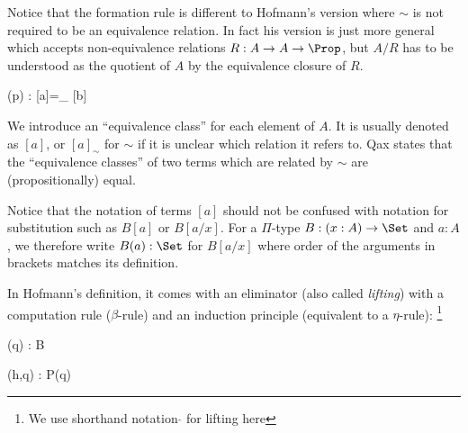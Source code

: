 \begin{remark}
Notice that the formation rule is different to Hofmann's version \cite{hof:95:sm} where $\sim$ is not required to be an equivalence relation. In fact his version is just more general which accepts non-equivalence relations $R : A \to A \to \Prop$, but $A/R$ has to be understood as the quotient of $A$ by the equivalence closure of $R$.
\end{remark}

\begin{multicols}{2}
\columnbreak
{}
{ \Gamma \vdash {}(p) : [a]=_{} [b]}
\end{multicols}


We introduce an ``equivalence class'' for each element of $A$. It is usually denoted as $[ a ]$, or $[ a ]_{\sim}$ for $\sim$ if it is unclear which relation it refers to. 
 Qax states that the ``equivalence classes'' of two terms which are related by $\sim$ are (propositionally) equal.

 Notice that the notation of terms $[a]$ should not be confused with notation for substitution such as $B[a]$ or $B [a/x]$. For a $\Pi$-type $B : (x : A) \to \Set$ and $a : A$, we therefore write $B(a) : \Set$ for $B [a/x]$ where order of the arguments in brackets matches its definition.



In Hofmann's \cite{hof:95:sm} definition, it comes with an eliminator (also called \emph{lifting}) with a computation rule ($\beta$-rule) and an induction principle (equivalent to a $\eta$-rule): \footnote{We use shorthand notation $\hat{}$ for lifting here} 


{\Gamma \vdash  {}(q) : B}



{\Gamma \vdash {}(h,q) : P(q)}

